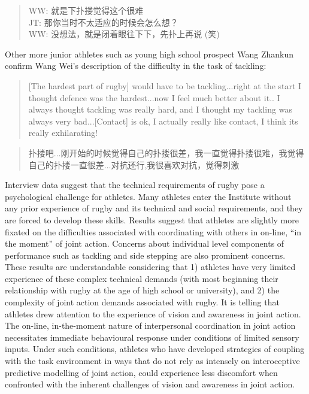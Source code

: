 \begin{CJK}{UTF8}{gbsn}
\begin{quotation}
  WW: 就是下扑搂觉得这个很难 \\
  JT: 那你当时不太适应的时候会怎么想？\\
  WW: 没想法，就是闭着眼往下下，先扑上再说 (笑)
\end{quotation}


Other more junior athletes such as young high school prospect Wang Zhankun confirm Wang Wei's description of the difficulty in the task of tackling:

\begin{quotation}
  [The hardest part of rugby] would have to be tackling...right at the start I thought defence was the hardest...now I feel much better about it.. I always thought tackling was really hard, and I thought my tackling was always very bad...[Contact] is ok, I actually really like contact, I think its really exhilarating!
\end{quotation}

\begin{quotation}
  扑搂吧...刚开始的时候觉得自己的扑搂很差，我一直觉得扑搂很难，我觉得自己的扑搂一直很差...对抗还行,我很喜欢对抗，觉得刺激
\end{quotation}

Interview data suggest that the technical requirements of rugby pose a psychological challenge for athletes.  Many athletes enter the Institute without any prior experience of rugby and its technical and social requirements, and they are forced to develop these skills.  Results suggest that athletes are slightly more fixated on the difficulties associated with coordinating with others in on-line, ``in the moment'' of joint action.  Concerns about individual level components of performance such as tackling and side stepping are also prominent concerns.  These results are understandable considering that 1) athletes have very limited experience of these complex technical demands (with most beginning their relationship with rugby at the age of high school or university), and 2) the complexity of joint action demands associated with rugby.  It is telling that athletes drew attention to the experience of vision and awareness in joint action.  The on-line, in-the-moment nature of interpersonal coordination in joint action necessitates immediate behavioural response under conditions of limited sensory inputs.  Under such conditions, athletes who have developed strategies of coupling with the task environment in ways that do not rely as intensely on interoceptive predictive modelling of joint action, could experience less discomfort when confronted with the inherent challenges of vision and awareness in joint action.



\end{CJK}
